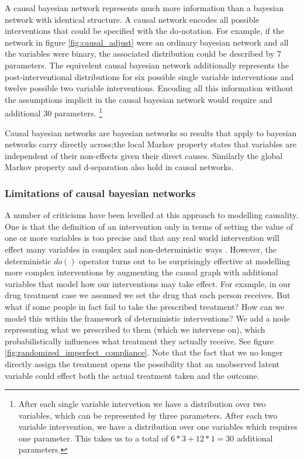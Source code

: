 \documentclass[11pt,a4paper,oneside]{book}
\theoremstyle{plain}
\theoremstyle{definition}
\begin{document}
A causal bayesian network represents much more information than a bayesian network with identical structure. A causal network encodes all possible interventions that could be specified with the do-notation. For example, if the network in figure \ref{fig:causal_adjust} were an ordinary bayesian network and all the variables were binary, the associated distribution could be described by 7 parameters. The equivelent causal bayesian network additionally represents the post-interventional distributions for six possible single variable interventions and twelve possible two variable interventions. Encoding all this information without the assumptions implicit in the causal bayesian network would require and additional 30 parameters. \footnote{After each single variable intervetion we have a distribution over two variables, which can be represented by three parameters. After each two variable intervention, we have a distribution over one variables which requires one parameter. This takes us to a total of $6*3+12*1 = 30$ additional parameters.}


Causal bayesian networks are bayesian networks so results that apply to bayesian networks carry directly across;the local Markov property states that variables are independent of their non-effects given their direct causes. Similarly the global Markov property and d-separation also hold in causal networks. 

\subsubsection{Limitations of causal bayesian networks}
A number of criticisms have been levelled at this approach to modelling causality. One is that the definition of an intervention only in terms of setting the value of one or more variables is too precise and that any real world intervention will effect many variables in complex and non-deterministic ways \citep{2009causality,cartwright2007hunting}. However, the deterministic $do()$ operator turns out to be surprisingly effective at modelling more complex interventions by augmenting the causal graph with additional variables that model how our interventions may take effect. For example, in our drug treatment case we assumed we set the drug that each person receives. But what if some people in fact fail to take the prescribed treatment? How can we model this within the framework of deterministic interventions? We add a node representing what we prescribed to them (which we intervene on), which probabilistically influences what treatment they actually receive. See figure \ref{fig:randomized_imperfect_compliance}. Note that the fact that we no longer directly assign the treatment opens the possibility that an unobserved latent variable could effect both the actual treatment taken and the outcome.
\end{document}
